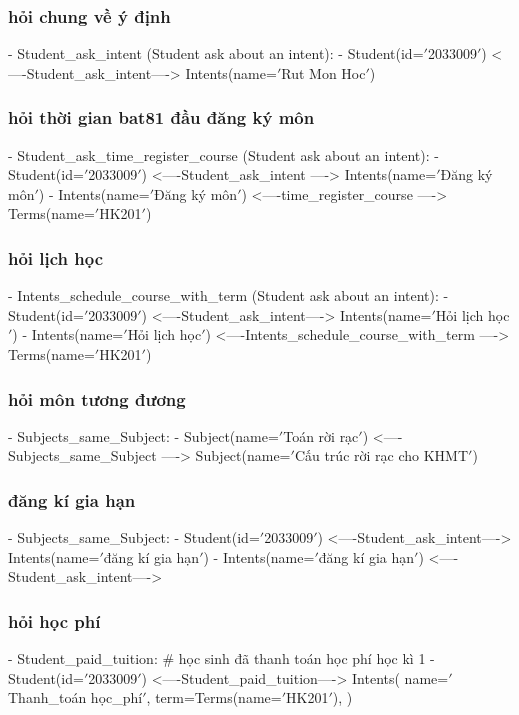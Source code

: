             \subsubsection{hỏi chung về ý định}
            - Student\_ask\_intent (Student ask about an intent):
                - Student(id=\('\)2033009\('\)) <----Student\_ask\_intent----> Intents(name=\('\)Rut Mon Hoc\('\))

            \subsubsection{hỏi thời gian bat81 đầu đăng ký môn}
            - Student\_ask\_time\_register\_course (Student ask about an intent):
                - Student(id=\('\)2033009\('\)) <----Student\_ask\_intent ----> Intents(name=\('\)Đăng ký môn\('\))
                - Intents(name=\('\)Đăng ký môn\('\)) <----time\_register\_course ----> Terms(name=\('\)HK201\('\))

            \subsubsection{hỏi lịch học}
            - Intents\_schedule\_course\_with\_term (Student ask about an intent):
                - Student(id=\('\)2033009\('\)) <----Student\_ask\_intent----> Intents(name=\('\)Hỏi lịch học\('\))
                - Intents(name=\('\)Hỏi lịch học\('\)) <----Intents\_schedule\_course\_with\_term ----> Terms(name=\('\)HK201\('\))

            \subsubsection{hỏi môn tương đương}
            - Subjects\_same\_Subject:
                - Subject(name=\('\)Toán rời rạc\('\))  <----Subjects\_same\_Subject ----> Subject(name=\('\)Cấu trúc rời rạc cho KHMT\('\))

            \subsubsection{đăng kí gia hạn}
            - Subjects\_same\_Subject:
                - Student(id=\('\)2033009\('\)) <----Student\_ask\_intent----> Intents(name=\('\)đăng kí gia hạn\('\))
                - Intents(name=\('\)đăng kí gia hạn\('\)) <----Student\_ask\_intent---->

            \subsubsection{hỏi học phí}
            - Student\_paid\_tuition: # học sinh đã thanh toán học phí học kì 1
                - Student(id=\('\)2033009\('\))
                  <----Student\_paid\_tuition---->
                  Intents(
                  name=\('\)Thanh\_toán học\_phí\('\),
                  term=Terms(name=\('\)HK201\('\)),
                  )

